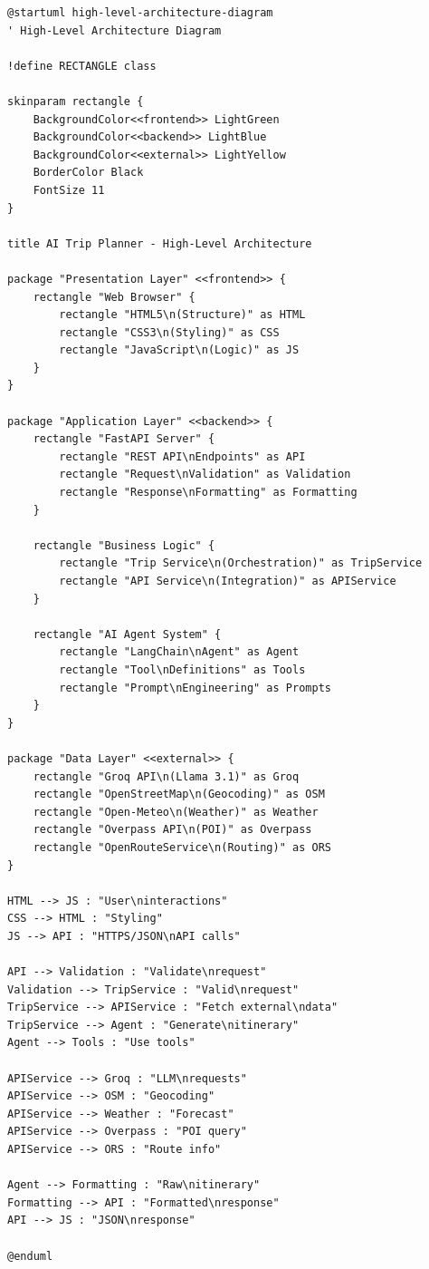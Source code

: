 \documentclass[12pt,a4paper]{report}
\begin{document}
\begin{lstlisting}[style=pythonstyle, caption={High-Level Architecture - PlantUML Code}, language={}]
@startuml high-level-architecture-diagram
' High-Level Architecture Diagram

!define RECTANGLE class

skinparam rectangle {
    BackgroundColor<<frontend>> LightGreen
    BackgroundColor<<backend>> LightBlue
    BackgroundColor<<external>> LightYellow
    BorderColor Black
    FontSize 11
}

title AI Trip Planner - High-Level Architecture

package "Presentation Layer" <<frontend>> {
    rectangle "Web Browser" {
        rectangle "HTML5\n(Structure)" as HTML
        rectangle "CSS3\n(Styling)" as CSS
        rectangle "JavaScript\n(Logic)" as JS
    }
}

package "Application Layer" <<backend>> {
    rectangle "FastAPI Server" {
        rectangle "REST API\nEndpoints" as API
        rectangle "Request\nValidation" as Validation
        rectangle "Response\nFormatting" as Formatting
    }
    
    rectangle "Business Logic" {
        rectangle "Trip Service\n(Orchestration)" as TripService
        rectangle "API Service\n(Integration)" as APIService
    }
    
    rectangle "AI Agent System" {
        rectangle "LangChain\nAgent" as Agent
        rectangle "Tool\nDefinitions" as Tools
        rectangle "Prompt\nEngineering" as Prompts
    }
}

package "Data Layer" <<external>> {
    rectangle "Groq API\n(Llama 3.1)" as Groq
    rectangle "OpenStreetMap\n(Geocoding)" as OSM
    rectangle "Open-Meteo\n(Weather)" as Weather
    rectangle "Overpass API\n(POI)" as Overpass
    rectangle "OpenRouteService\n(Routing)" as ORS
}

HTML --> JS : "User\ninteractions"
CSS --> HTML : "Styling"
JS --> API : "HTTPS/JSON\nAPI calls"

API --> Validation : "Validate\nrequest"
Validation --> TripService : "Valid\nrequest"
TripService --> APIService : "Fetch external\ndata"
TripService --> Agent : "Generate\nitinerary"
Agent --> Tools : "Use tools"

APIService --> Groq : "LLM\nrequests"
APIService --> OSM : "Geocoding"
APIService --> Weather : "Forecast"
APIService --> Overpass : "POI query"
APIService --> ORS : "Route info"

Agent --> Formatting : "Raw\nitinerary"
Formatting --> API : "Formatted\nresponse"
API --> JS : "JSON\nresponse"

@enduml
\end{lstlisting}
\end{document}

